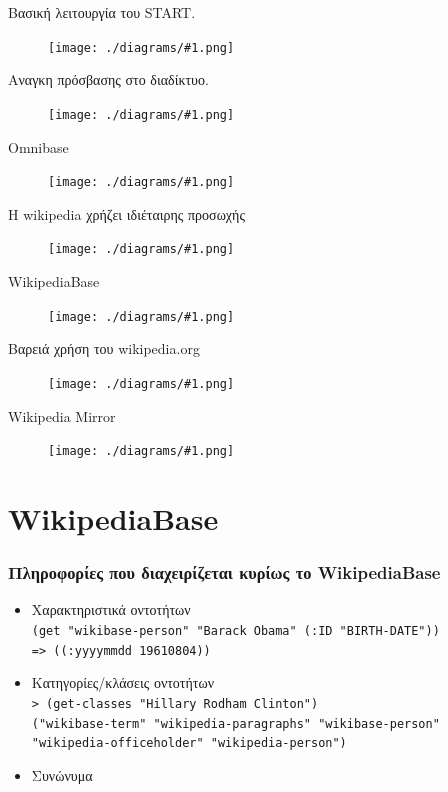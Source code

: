 \documentclass[bigger]{beamer}
\newcommand{\figframe}[2]{
  \begin{frame}{#2}
    \vfill
    \begin{figure}
      \centering
      \texttt{[image: ./diagrams/\#1.png]}
    \end{figure}
    \vfill
  \end{frame}
}
\begin{document}
\figframe{start}{Βασική λειτουργία του START.}
\figframe{start-web}{Αναγκη πρόσβασης στο διαδίκτυο.}
\figframe{omnibase}{Omnibase}
\figframe{wikipedia-missing}{Η wikipedia χρήζει ιδιέταιρης προσωχής}
\figframe{wikipedia}{WikipediaBase}
\figframe{wikipedia-problem}{Βαρειά χρήση του wikipedia.org}
\figframe{wikipedia-mirror}{Wikipedia Mirror}

\section{WikipediaBase}

\begin{frame}
  \frametitle{Πληροφορίες που διαχειρίζεται κυρίως το WikipediaBase}
  \begin{itemize}
  \item Χαρακτηριστικά οντοτήτων \\
    \texttt{(get "wikibase-person" "Barack Obama" (:ID "BIRTH-DATE"))} \\
    \texttt{=> ((:yyyymmdd 19610804))}
  \item Κατηγορίες/κλάσεις οντοτήτων \\
    \texttt{> (get-classes "Hillary Rodham Clinton")} \\
    \texttt{("wikibase-term"
      "wikipedia-paragraphs"
      "wikibase-person"
      "wikipedia-officeholder"
      "wikipedia-person")}
  \item Συνώνυμα
  \end{itemize}
\end{frame}
\end{document}
